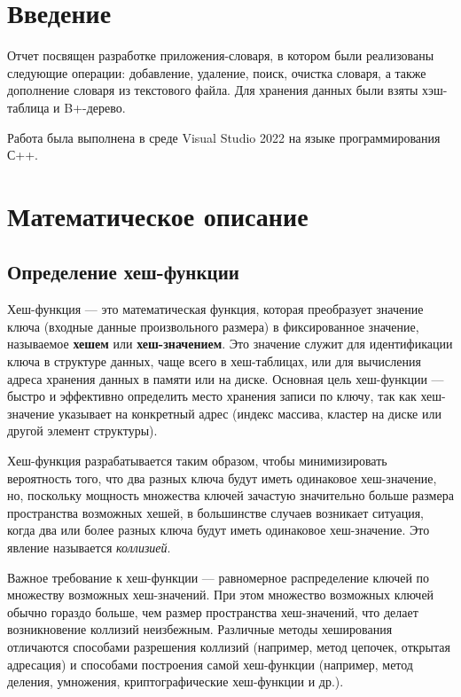 \documentclass[11pt,a4paper,final]{article} %
\begin{document}
\newpage

\tableofcontents

\newpage
\section* {Введение}
\par Отчет посвящен разработке приложения-словаря, в котором были реализованы следующие операции: добавление, удаление, поиск, очистка словаря, а также дополнение словаря из текстового файла. Для хранения данных были взяты хэш-таблица и B+-дерево. 

\par Работа была выполнена в среде Visual Studio 2022 на языке программирования С++.
	

\newpage
\section{Математическое описание}
\subsection{Определение хеш-функции}

Хеш-функция — это математическая функция, которая преобразует значение ключа (входные данные произвольного размера) в фиксированное значение, называемое \textbf{хешем} или \textbf{хеш-значением}. Это значение служит для идентификации ключа в структуре данных, чаще всего в хеш-таблицах, или для вычисления адреса хранения данных в памяти или на диске. Основная цель хеш-функции — быстро и эффективно определить место хранения записи по ключу, так как хеш-значение указывает на конкретный адрес (индекс массива, кластер на диске или другой элемент структуры).

Хеш-функция разрабатывается таким образом, чтобы минимизировать вероятность того, что два разных ключа будут иметь одинаковое хеш-значение, но, поскольку мощность множества ключей зачастую значительно больше размера пространства возможных хешей, в большинстве случаев возникает ситуация, когда два или более разных ключа будут иметь одинаковое хеш-значение. Это явление называется \textit{коллизией}.

Важное требование к хеш-функции — равномерное распределение ключей по множеству возможных хеш-значений. При этом множество возможных ключей обычно гораздо больше, чем размер пространства хеш-значений, что делает возникновение коллизий неизбежным. Различные методы хеширования отличаются способами разрешения коллизий (например, метод цепочек, открытая адресация) и способами построения самой хеш-функции (например, метод деления, умножения, криптографические хеш-функции и др.).
\end{document}
